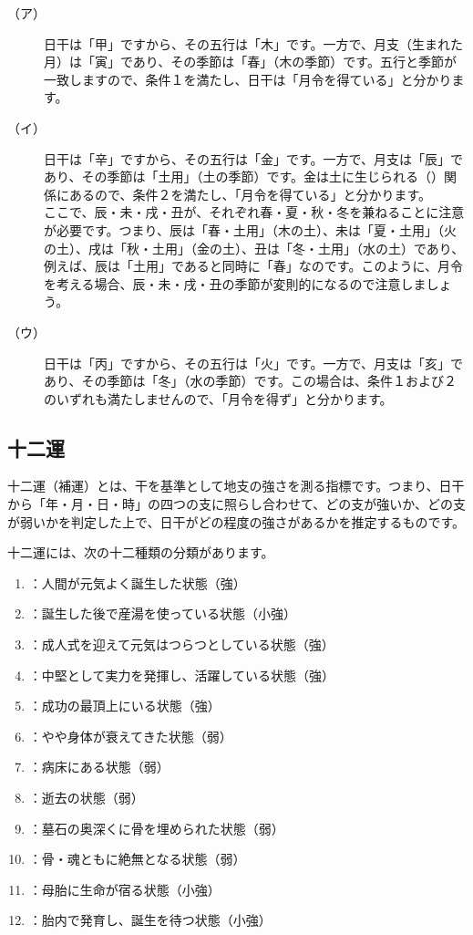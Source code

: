 \documentclass[a5paper,11pt,dvipdfmx]{tarticle}
\begin{document}
\begin{description}
 \item[（ア）] 日干は「甲」ですから、その五行は「木」です。一方で、月支（生まれた月）は「寅」であり、その季節は「春」（木の季節）です。五行と季節が一致しますので、条件１を満たし、日干は「月令を得ている」と分かります。
 \item[（イ）] 日干は「辛」ですから、その五行は「金」です。一方で、月支は「辰」であり、その季節は「土用」（土の季節）です。金は土に生じられる（）関係にあるので、条件２を満たし、「月令を得ている」と分かります。\\
ここで、辰・未・戌・丑が、それぞれ春・夏・秋・冬を兼ねることに注意が必要です。つまり、辰は「春・土用」（木の土）、未は「夏・土用」（火の土）、戌は「秋・土用」（金の土）、丑は「冬・土用」（水の土）であり、例えば、辰は「土用」であると同時に「春」なのです。このように、月令を考える場合、辰・未・戌・丑の季節が変則的になるので注意しましょう。
 \item[（ウ）] 日干は「丙」ですから、その五行は「火」です。一方で、月支は「亥」であり、その季節は「冬」（水の季節）です。この場合は、条件１および２のいずれも満たしませんので、「月令を得ず」と分かります。
\end{description}


\subsection{十二運}
十二運（補運）とは、干を基準として地支の強さを測る指標です。つまり、日干から「年・月・日・時」の四つの支に照らし合わせて、どの支が強いか、どの支が弱いかを判定した上で、日干がどの程度の強さがあるかを推定するものです。

十二運には、次の十二種類の分類があります。

\begin{enumerate}
\item {}：人間が元気よく誕生した状態（強）
\item {}：誕生した後で産湯を使っている状態（小強）
\item {}：成人式を迎えて元気はつらつとしている状態（強）
\item {}：中堅として実力を発揮し、活躍している状態（強）
\item {}：成功の最頂上にいる状態（強）
\item {}：やや身体が衰えてきた状態（弱）
\item {}：病床にある状態（弱）
\item {}：逝去の状態（弱）
\item {}：墓石の奥深くに骨を埋められた状態（弱）
\item {}：骨・魂ともに絶無となる状態（弱）
\item {}：母胎に生命が宿る状態（小強）
\item {}：胎内で発育し、誕生を待つ状態（小強）
\end{enumerate}
\end{document}
